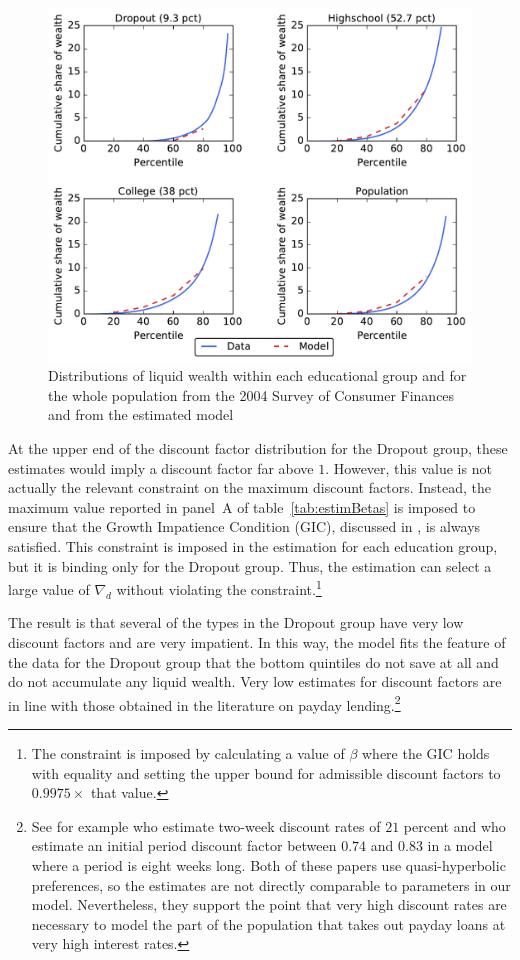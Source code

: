\documentclass[../HAFiscal]{subfiles}
\begin{document}
\begin{figure}[th]
\begin{center}
	\includegraphics[width=.9\textwidth]{../Figures/LorenzPoints.pdf}
	\caption{Distributions of liquid wealth within each educational group and for the whole population from the 2004 Survey of Consumer Finances and from the estimated model}
	\label{fig:LorenzPts}
\end{center}
\end{figure}

At the upper end of the discount factor distribution for the Dropout group, these estimates would imply a discount factor far above $1$. However, this value is not actually the relevant constraint on the maximum discount factors. Instead, the maximum value reported in panel~A of table~\ref{tab:estimBetas} is imposed to ensure that the Growth Impatience Condition (GIC), discussed in \cite{carroll2022theoretical}, is always satisfied. This constraint is imposed in the estimation for each education group, but it is binding only for the Dropout group. Thus, the estimation can select a large value of $\nabla_d$ without violating the constraint.\footnote{The constraint is imposed by calculating a value of $\beta$ where the GIC holds with equality and setting the upper bound for admissible discount factors to $0.9975 \times$ that value.}

The result is that several of the types in the Dropout group have very low discount factors and are very impatient. In this way, the model fits the feature of the data for the Dropout group that the bottom quintiles do not save at all and do not accumulate any liquid wealth. Very low estimates for discount factors are in line with those obtained in the literature on payday lending.\footnote{See for example \cite{skiba2008payday} who estimate two-week discount rates of $21$ percent and \cite{allcott2021high} who estimate an initial period discount factor between $0.74$ and $0.83$ in a model where a period is eight weeks long. Both of these papers use quasi-hyperbolic preferences, so the estimates are not directly comparable to parameters in our model. Nevertheless, they support the point that very high discount rates are necessary to model the part of the population that takes out payday loans at very high interest rates.} 
\end{document}
